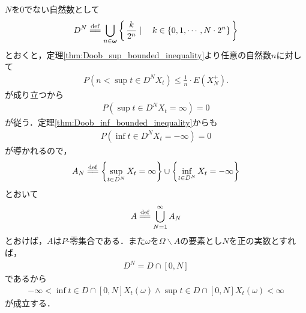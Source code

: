	\begin{sketch}
		$N$を$0$でない自然数として
		\begin{align}
			D^N \defeq \bigcup_{n \in \Natural} \Set{\frac{k}{2^n}}{k \in \{0,1,\cdots,N \cdot 2^n\}}
		\end{align}
		とおくと，定理\ref{thm:Doob_sup_bounded_inequality}より任意の自然数$n$に対して
		\begin{align}
			P\left(n < \sup{t \in D^N}{X_t}\right)
			\leq \frac{1}{n} \cdot E\left(X_N^+\right).
		\end{align}
		が成り立つから
		\begin{align}
			P\left(\sup{t \in D^N}{X_t} = \infty\right) = 0
		\end{align}
		が従う．定理\ref{thm:Doob_inf_bounded_inequality}からも
		\begin{align}
			P\left(\inf{t \in D^N}{X_t} = -\infty\right) = 0
		\end{align}
		が導かれるので，
		\begin{align}
			A_N \defeq \left\{\sup{t \in D^N}{X_t} = \infty\right\} \cup \left\{\inf{t \in D^N}{X_t} = -\infty\right\}
		\end{align}
		とおいて
		\begin{align}
			A \defeq \bigcup_{N=1}^\infty A_N
		\end{align}
		とおけば，$A$は$P$-零集合である．また$\omega$を$\Omega \backslash A$の要素とし$N$を正の実数とすれば，
		\begin{align}
			D^N = D \cap [0,N]
		\end{align}
		であるから
		\begin{align}
			- \infty < \inf{t \in D \cap [0,N]}X_t(\omega) \wedge \sup{t \in D \cap [0,N]}X_t(\omega) < \infty
		\end{align}
		が成立する．
		\QED
	\end{sketch}
	
